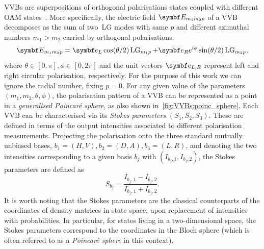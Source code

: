 \acfp{VVB} are superpositions of orthogonal polarisations states coupled with different \ac{OAM} states~\cite{padgett2004lights}.
More specifically, the electric field $\bs{E}_{m_1m_2p}$ of a \ac{VVB} decomposes as the sum of two~\ac{LG} modes with same $p$ and different azimuthal numbers $m_1>m_2$ carried by orthogonal polarisations:
\begin{equation}
	\bs{E}_{m_1m_2p} =
	\bs{e}_L \cos(\theta/2)\on{LG}_{m_1p} +
	\bs{e}_R e^{i \phi} \sin(\theta/2)\on{LG}_{m_2p},
	\label{eq:VVBs:definition_VVBs_field}
\end{equation}
where $\theta\in[0,\pi], \phi\in[0,2\pi]$ and the unit vectors $\bs{e}_{L,R}$ represent left and right circular polarisation, respectively.
For the purpose of this work we can ignore the radial number, fixing $p=0$.
For any given value of the parameters $(m_1, m_2, \theta, \phi)$, the polarisation pattern of a \ac{VVB} can be represented as a point in a \emph{generalised Poincar\'e sphere}, as also shown in~\cref{fig:VVBs:poinc_sphere}.
Each VVB can be characterised via its \emph{Stokes parameters} $(S_1,S_2,S_3)$.
These are defined in terms of the output intensities associated to different polarisation measurements.
Projecting the polarisation onto the three standard mutually unbiased bases, $b_1=(H,V), b_2=(D,A), b_3=(L,R)$, and denoting the two intensities corresponding to a given basis $b_j$ with $(I_{b_j,1},I_{b_j,2})$, the Stokes parameters are defined as
\begin{equation}
	S_{b_j} = \frac{I_{b_j,1}-I_{b_j,2}}{I_{b_j,1}+I_{b_j,2}}.
\end{equation}
It is worth noting that the Stokes parameters are the classical counterparts of the coordinates of density matrices in state space, upon replacement of intensities with probabilities.
In particular, for states living in a two-dimensional space, the Stokes parameters correspond to the coordinates in the Bloch sphere (which is often referred to as a \emph{Poincaré sphere} in this context).

